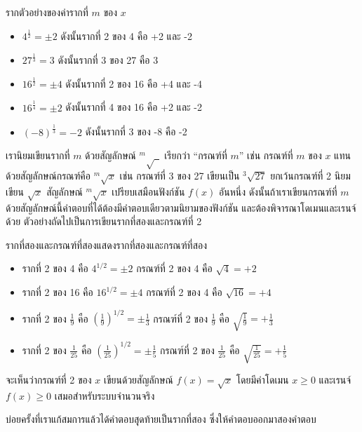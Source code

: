 \begin{example}{ราก}ตัวอย่างของค่ารากที่ $m$ ของ $x$
\begin{itemize}
	\item $4^{\frac{1}{2}}=\pm 2$  ดังนั้นรากที่ 2 ของ 4 คือ +2 และ -2
	\item $27^{\frac{1}{3}} = 3$ ดังนั้นรากที่ 3 ของ 27 คือ 3
	\item $16^{\frac{1}{2}}=\pm 4$ ดังนั้นรากที่ 2 ของ 16 คือ +4 และ -4
	\item $16^{\frac{1}{4}}=\pm 2$ ดังนั้นรากที่ 4 ของ 16 คือ +2 และ -2
	\item $(-8)^{\frac{1}{3}}=-2$ ดังนั้นรากที่ 3 ของ -8 คือ -2
\end{itemize}
\end{example}
เรานิยมเขียนรากที่ $m$ ด้วยสัญลักษณ์ $^m\sqrt{\,\,\,}$ เรียกว่า ``กรณฑ์ที่ $m$'' เช่น กรณฑ์ที่ $m$ ของ $x$ แทนด้วยสัญลักษณ์กรณฑ์คือ $^{m}\sqrt{x}$ เช่น กรณฑ์ที่ 3 ของ 27 เขียนเป็น $^{3}\sqrt{27}$ ยกเว้นกรณฑ์ที่ 2 นิยมเขียน $\sqrt{x}$ สัญลักษณ์ $^{m}\sqrt{x}$ เปรียบเสมือนฟังก์ชัน $f(x)$ อันหนึ่ง ดังนั้นถ้าเราเขียนกรณฑ์ที่ $m$ ด้วยสัญลักษณ์นี้คำตอบที่ได้ต้องมีคำตอบเดียวตามนิยามของฟังก์ชัน และต้องพิจารณาโดเมนและเรนจ์ด้วย ตัวอย่างถัดไปเป็นการเขียนรากที่สองและกรณฑ์ที่ 2
\begin{example}{รากที่สองและกรณฑ์ที่สอง}แสดงรากที่สองและกรณฑ์ที่สอง
\begin{itemize}
 	\item รากที่ 2 ของ 4 คือ $4^{1/2}=\pm 2$ กรณฑ์ที่ 2 ของ 4 คือ $\sqrt{4}=+2$
	\item รากที่ 2 ของ 16 คือ $16^{1/2}=\pm 4$ กรณฑ์ที่ 2 ของ 4 คือ $\sqrt{16}=+4$
	\item รากที่ 2 ของ $\frac{1}{9}$ คือ $\left(\frac{1}{9}\right)^{1/2}=\pm \frac{1}{3}$ กรณฑ์ที่ 2 ของ $\frac{1}{9}$ คือ $\sqrt{\frac{1}{9}}=+\frac{1}{3}$
	\item รากที่ 2 ของ $\frac{1}{25}$ คือ $\left(\frac{1}{25}\right)^{1/2}=\pm \frac{1}{5}$ กรณฑ์ที่ 2 ของ $\frac{1}{25}$ คือ $\sqrt{\frac{1}{25}}=+\frac{1}{5}$
\end{itemize}
จะเห็นว่ากรณฑ์ที่ 2 ของ $x$ เขียนด้วยสัญลักษณ์ $f(x)=\sqrt{x}$ โดยมีค่าโดเมน $x\ge 0$ และเรนจ์ $f(x)\ge 0$ เสมอสำหรับระบบจำนวนจริง
\end{example}
บ่อยครั้งที่เราแก้สมการแล้วได้คำตอบสุุดท้ายเป็นรากที่สอง ซึ่งให้คำตอบออกมาสองคำตอบ
